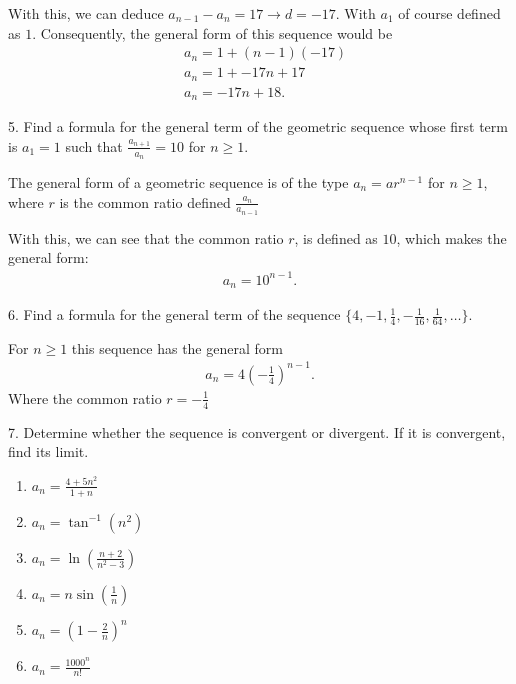 \documentclass{report}
\begin{document}
    \bigbreak \noindent 
    With this, we can deduce $a_{n-1} - a_{n} =17 \rightarrow d = -17$. With $a_{1}$ of course defined as $1$. Consequently, the general form of this sequence would be
    \begin{align*}
        &a_{n} = 1 + (n-1)(-17) \\
        &a_{n} = 1 + -17n +17 \\
        &a_{n} = -17n + 18
    .\end{align*}

    \bigbreak \noindent 
    \begin{mdframed}
        5. Find a formula for the general term of the geometric sequence whose first term is \( a_1 = 1 \) such that \(\frac{a_{n+1}}{a_n} = 10\) for \( n \geq 1 \).
    \end{mdframed}
    \bigbreak \noindent 
    \begin{remark}
       The general form of a geometric sequence is of the type $a_{n}= ar^{n-1}$ for $n \geq 1$, where $r$ is the common ratio defined $\frac{a_{n}}{a_{n-1}}$ 
    \end{remark}
    \bigbreak \noindent 
    With this, we can see that the common ratio $r$, is defined as $10$, which makes the general form:
    \begin{align*}
        a_{n} = 10^{n-1}
    .\end{align*}

    \bigbreak \noindent 
    \begin{mdframed}
        6. Find a formula for the general term of the sequence \( \{4, -1, \frac{1}{4}, -\frac{1}{16}, \frac{1}{64}, \ldots\} \).
    \end{mdframed}
    \bigbreak \noindent 
    For $n \geq 1$ this sequence has the general form
    \begin{align*}
        a_{n} = 4\left(-\frac{1}{4}\right)^{n-1}
    .\end{align*}
    \bigbreak \noindent 
    Where the common ratio $r = -\frac{1}{4}$

    \pagebreak \bigbreak \noindent 
    \begin{mdframed}
        7. Determine whether the sequence is convergent or divergent. If it is convergent, find its limit.
        \begin{enumerate}[label=(\alph*)]
            \item $a_{n} = \frac{4+5n^{2}}{1+n} $
            \item $a_{n} = \tan^{-1}{(n^{2})} $
            \item $a_{n} = \ln{\left(\frac{n+2}{n^{2}-3}\right)} $
            \item $a_{n} = n\sin{\left(\frac{1}{n}\right)} $
            \item $a_{n} = \left(1-\frac{2}{n}\right)^{n}$
            \item $a_{n}= \frac{1000^{n}}{n!}$
        \end{enumerate}

    \end{mdframed}
\end{document}
